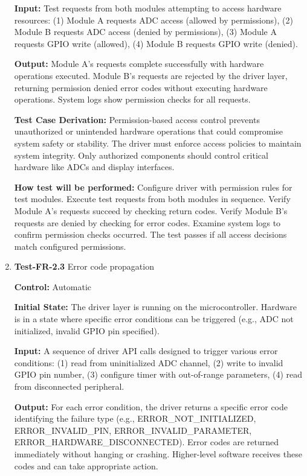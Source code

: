 \documentclass[12pt, titlepage]{article}
\begin{document}
\begin{enumerate}
\textbf{Input:}
Test requests from both modules attempting to access hardware resources: (1)
Module A requests ADC access (allowed by permissions), (2) Module B requests ADC
access (denied by permissions), (3) Module A requests GPIO write (allowed), (4)
Module B requests GPIO write (denied).
					
\textbf{Output:}
Module A's requests complete successfully with hardware operations executed.
Module B's requests are rejected by the driver layer, returning permission
denied error codes without executing hardware operations. System logs show
permission checks for all requests.

\textbf{Test Case Derivation:} 
Permission-based access control prevents unauthorized or unintended hardware
operations that could compromise system safety or stability. The driver must
enforce access policies to maintain system integrity. Only authorized components
should control critical hardware like ADCs and display interfaces.
					
\textbf{How test will be performed:}
Configure driver with permission rules for test modules. Execute test requests
from both modules in sequence. Verify Module A's requests succeed by checking
return codes. Verify Module B's requests are denied by checking for error codes.
Examine system logs to confirm permission checks occurred. The test passes if
all access decisions match configured permissions.

\item{\textbf{Test-FR-2.3} Error code propagation\\}

\textbf{Control:} Automatic
					
\textbf{Initial State:} 
The driver layer is running on the microcontroller. Hardware is in a state where
specific error conditions can be triggered (e.g., ADC not initialized, invalid
GPIO pin specified).
					
\textbf{Input:}
A sequence of driver API calls designed to trigger various error conditions: (1)
read from uninitialized ADC channel, (2) write to invalid GPIO pin number, (3)
configure timer with out-of-range parameters, (4) read from disconnected
peripheral.
					
\textbf{Output:}
For each error condition, the driver returns a specific error code identifying
the failure type (e.g., ERROR\_NOT\_INITIALIZED, ERROR\_INVALID\_PIN,
ERROR\_INVALID\_PARAMETER, \\ ERROR\_HARDWARE\_DISCONNECTED). Error codes are
returned immediately without hanging or crashing. Higher-level software receives
these codes and can take appropriate action.


\end{enumerate}
\end{document}
